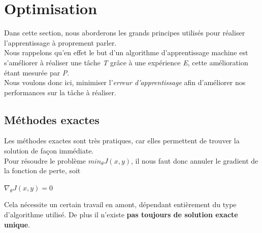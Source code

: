 \documentclass[10pt,a4paper]{report}
\begin{document}
	\section{Optimisation}
	Dans cette section, nous aborderons les grands principes utilisés pour réaliser l'apprentissage à proprement parler.\\
	Nous rappelons qu'en effet le but d'un algorithme d'apprentissage machine est s'améliorer à réaliser une tâche \emph{T} grâce à une expérience \emph{E}, cette amélioration étant mesurée par \emph{P}.\\
	Nous voulons donc ici, minimiser l'\emph{erreur d'apprentissage} afin d'améliorer nos performances sur la tâche à réaliser.\\
		\subsection{Méthodes exactes}
		Les méthodes exactes sont très pratiques, car elles permettent de trouver la solution de façon immédiate.\\
		Pour résoudre le problème $min_{\theta}J(x,y)$, il nous faut donc annuler le gradient de la fonction de perte, soit
		\begin{center}
			$\nabla_{\theta} J(x,y) = 0$
		\end{center}
		Cela nécessite un certain travail en amont, dépendant entièrement du type d'algorithme utilisé.
		De plus il n'existe \textbf{pas toujours de solution exacte unique}.
\end{document}
